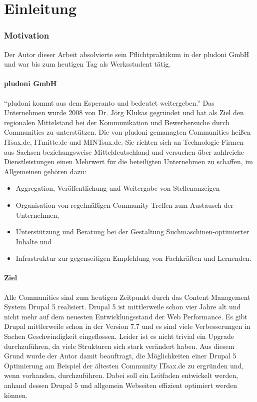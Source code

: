 \part{Einleitung}

\label{sec:intro}
\section{Motivation}

Der Autor dieser Arbeit absolvierte sein Pflichtpraktikum in der pludoni GmbH und war bis zum heutigen Tag als Werksstudent tätig.
\subsection{pludoni GmbH}
“pludoni kommt aus dem Esperanto und bedeutet weitergeben.” Das Unternehmen wurde 2008 von Dr. Jörg Klukas gegründet und hat als Ziel den regionalen Mittelstand bei der Kommunikation und Bewerbersuche durch Communities zu unterstützen. Die von pludoni gemanagten Communities heißen ITsax.de, ITmitte.de und MINTsax.de. Sie richten sich an Technologie-Firmen aus Sachsen beziehungsweise Mitteldeutschland und versuchen über zahlreiche Dienstleistungen einen Mehrwert für die beteiligten Unternehmen zu schaffen, im Allgemeinen gehören dazu:

\begin{itemize}
 \item Aggregation, Veröffentlichung und Weitergabe von Stellenanzeigen
 \item Organisation von regelmäßigen Community-Treffen zum Austausch der Unternehmen,
 \item Unterstützung und Beratung bei der Gestaltung Suchmaschinen-optimierter Inhalte und
 \item Infrastruktur zur gegenseitigen Empfehlung von Fachkräften und Lernenden.
\end{itemize}

\subsection{Ziel}
Alle Communities sind zum heutigen Zeitpunkt durch das Content Management System Drupal 5 realisiert. Drupal 5 ist mittlerweile schon vier Jahre alt und nicht mehr auf dem neuesten Entwicklungsstand der Web Performance. Es gibt Drupal mittlerweile schon in der Version 7.7 und es sind viele Verbesserungen in Sachen Geschwindigkeit eingeflossen. Leider ist es nicht trivial ein Upgrade durchzuführen, da viele Strukturen sich stark verändert haben. Aus diesem Grund wurde der Autor damit beauftragt, die Möglichkeiten einer Drupal 5 Optimierung am Beispiel der ältesten Community ITsax.de zu ergründen und, wenn vorhanden, durchzuführen. Dabei soll ein Leitfaden entwickelt werden, anhand dessen Drupal 5 und allgemein Webseiten effizient optimiert werden können.


